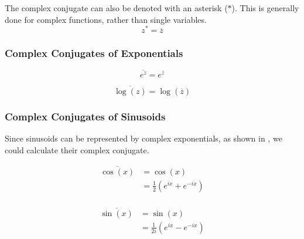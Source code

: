 The complex conjugate can also be denoted with an asterisk ($*$).
This is generally done for complex functions, rather than single variables.
\begin{equation}\label{eq:Complex_Conjugates_Asterisk}
  z^{*} = \overline{z}
\end{equation}

\subsubsection{Complex Conjugates of Exponentials}\label{app:Exponential_Complex_Conjugates}
\begin{equation}\label{eq:Exponential_Complex_Conjugates-e}
  \overline{e^{z}} = e^{\overline{z}}
\end{equation}

\begin{equation}\label{eq:Exponential_Complex_Conjugates-log}
  \overline{\log(z)} = \log(\overline{z})
\end{equation}

\subsubsection{Complex Conjugates of Sinusoids}\label{app:Sinusoid_Complex_Conjugates}
Since sinusoids can be represented by complex exponentials, as shown in , we could calculate their complex conjugate.

\begin{equation}\label{eq:Sinusoid_Complex_Conjugate-Cosine}
  \begin{aligned}
    \overline{\cos(x)} &= \cos(x) \\
    &= \frac{1}{2} \left( e^{ix} + e^{-ix} \right) \\
  \end{aligned}
\end{equation}

\begin{equation}\label{eq:Sinusoid_Complex_Conjugate-Sine}
  \begin{aligned}
    \overline{\sin(x)} &= \sin(x) \\
    &= \frac{1}{2i} \left( e^{ix} - e^{-ix} \right) \\
  \end{aligned}
\end{equation}

